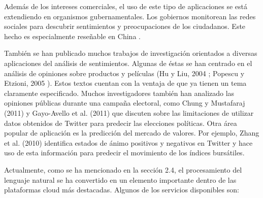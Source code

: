 Además de los intereses comerciales, el uso de este tipo de aplicaciones se está extendiendo en organismos gubernamentales. Los gobiernos monitorean las redes sociales para descubrir sentimientos y preocupaciones de los ciudadanos. Este hecho es especialmente reseñable en China \cite{sentimentAnalysis}. 

También se han publicado muchos trabajos de investigación orientados a diversas aplicaciones del análisis de sentimientos. Algunas de éstas se han centrado en el análisis de opiniones sobre productos y películas (Hu y Liu, 2004 \cite{hu2004}; Popescu y Etzioni, 2005 \cite{popescu}). Estos textos cuentan con la ventaja de que ya tienen un tema claramente especificado. Muchos investigadores también han analizado las opiniones públicas durante una campaña electoral, como Chung y Mustafaraj (2011) \cite{twitterPolitical} y Gayo-Avello et al. (2011) \cite{gayo-avello} que discuten sobre las limitaciones de utilizar datos obtenidos de Twitter para predecir las elecciones políticas. Otra área popular de aplicación es la predicción del mercado de valores. Por ejemplo, Zhang et al. (2010) \cite{zhanget} identifica estados de ánimo positivos y negativos en Twitter y hace uso de esta información para predecir el movimiento de los índices bursátiles.

Actualmente, como se ha mencionado en la sección 2.4, el procesamiento del lenguaje natural se ha convertido en un elemento importante dentro de las plataformas cloud más destacadas. Algunos de los servicios disponibles son:

